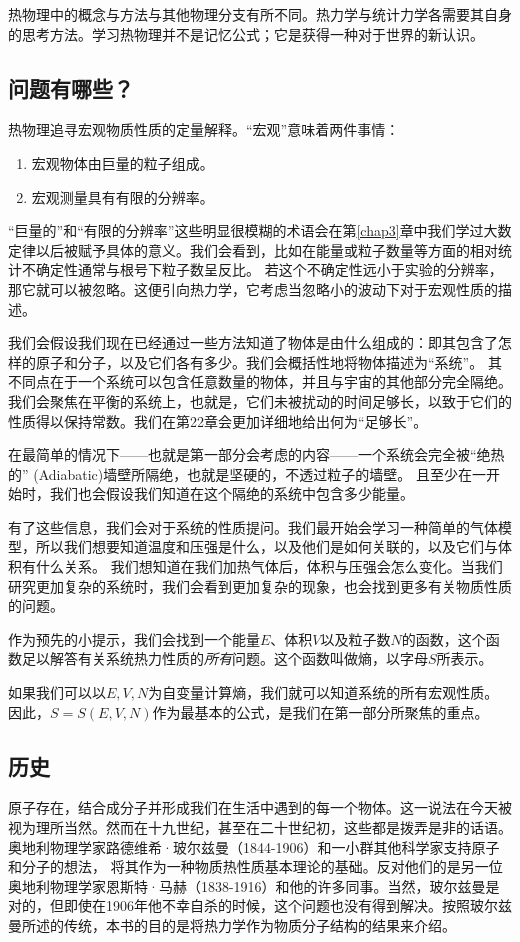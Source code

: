 \documentclass[UTF8]{ctexart}
\numberwithin{equation}{section}%
\numberwithin{figure}{section}%
\begin{document}
    热物理中的概念与方法与其他物理分支有所不同。热力学与统计力学各需要其自身的思考方法。学习热物理并不是记忆公式；它是获得一种对于世界的新认识。
    \subsection{问题有哪些？}
    热物理追寻宏观物质性质的定量解释。“宏观”意味着两件事情：
    \begin{enumerate} 
        \item 宏观物体由巨量的粒子组成。
        \item 宏观测量具有有限的分辨率。
    \end{enumerate}
    
    “巨量的”和“有限的分辨率”这些明显很模糊的术语会在第\ref{chap3}章中我们学过大数定律以后被赋予具体的意义。我们会看到，比如在能量或粒子数量等方面的相对统计不确定性通常与根号下粒子数呈反比。
    若这个不确定性远小于实验的分辨率，那它就可以被忽略。这便引向热力学，它考虑当忽略小的波动下对于宏观性质的描述。

    我们会假设我们现在已经通过一些方法知道了物体是由什么组成的：即其包含了怎样的原子和分子，以及它们各有多少。我们会概括性地将物体描述为“系统”。
    其不同点在于一个系统可以包含任意数量的物体，并且与宇宙的其他部分完全隔绝。我们会聚焦在平衡的系统上，也就是，它们未被扰动的时间足够长，以致于它们的性质得以保持常数。我们在第22章会更加详细地给出何为“足够长”。

    在最简单的情况下——也就是第一部分会考虑的内容——一个系统会完全被“绝热的” (Adiabatic)墙壁所隔绝，也就是坚硬的，不透过粒子的墙壁。
    且至少在一开始时，我们也会假设我们知道在这个隔绝的系统中包含多少能量。

    有了这些信息，我们会对于系统的性质提问。我们最开始会学习一种简单的气体模型，所以我们想要知道温度和压强是什么，以及他们是如何关联的，以及它们与体积有什么关系。
    我们想知道在我们加热气体后，体积与压强会怎么变化。当我们研究更加复杂的系统时，我们会看到更加复杂的现象，也会找到更多有关物质性质的问题。

    作为预先的小提示，我们会找到一个能量$E$、体积$V$以及粒子数$N$的函数，这个函数足以解答有关系统热力性质的\textit{所有}问题。这个函数叫做熵，以字母$S$所表示。

    如果我们可以以$E,V,N$为自变量计算熵，我们就可以知道系统的所有宏观性质。因此，$S=S(E,V,N)$作为最基本的公式，是我们在第一部分所聚焦的重点。

    \subsection{历史}
    原子存在，结合成分子并形成我们在生活中遇到的每一个物体。这一说法在今天被视为理所当然。然而在十九世纪，甚至在二十世纪初，这些都是拨弄是非的话语。奥地利物理学家路德维希·玻尔兹曼（1844-1906）和一小群其他科学家支持原子和分子的想法，
    将其作为一种物质热性质基本理论的基础。反对他们的是另一位奥地利物理学家恩斯特·马赫（1838-1916）和他的许多同事。当然，玻尔兹曼是对的，但即使在1906年他不幸自杀的时候，这个问题也没有得到解决。按照玻尔兹曼所述的传统，本书的目的是将热力学作为物质分子结构的结果来介绍。
\end{document}
